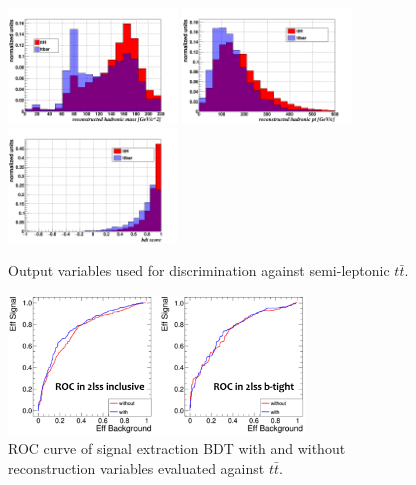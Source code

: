 \begin{figure}[htb]
 \centering
   \includegraphics[width=0.4\textwidth]{plots_reconstruction/had_top_mass.png}
   \includegraphics[width=0.4\textwidth]{plots_reconstruction/had_top_pt.png}\\
   \includegraphics[width=0.4\textwidth]{plots_reconstruction/bdt_score.png}
   \caption{Output variables used for discrimination against semi-leptonic $t\bar{t}$.}
  \label{reconstruction:outputVars}
\end{figure}

\begin{figure}[htb]
 \centering
   \includegraphics[width=0.7\textwidth]{plots_reconstruction/roc_improvement.png}
   \caption{ROC curve of signal extraction BDT with and without reconstruction variables evaluated against $t\bar{t}$.}
  \label{reconstruction:roc}
\end{figure}


